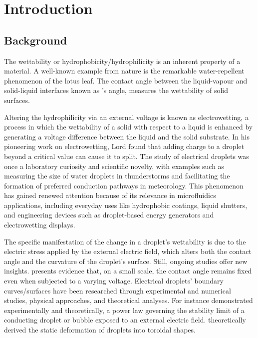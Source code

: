 \chapter{Introduction}
\setcounter{page}{1}%



\section{Background}
\hspace{0em}\indent The wettability or hydrophobicity/hydrophilicity is an inherent property of a material. A well-known example from nature is the remarkable water-repellent phenomenon of the lotus leaf. The contact angle between the liquid-vapour and solid-liquid interfaces known as \citeauthor{young_1805}’s angle, measures the wettability of solid surfaces. 

Altering the hydrophilicity via an external voltage is known as electrowetting, a process in which the wettability of a solid with respect to a liquid is enhanced by generating a voltage difference between the liquid and the solid substrate\cite{quin_05}. In his pioneering work on electrowetting, Lord \citeauthor{Rayleigh_1882} found that adding charge to a droplet beyond a critical value can cause it to split. The study of electrical droplets was once a laboratory curiosity and scientific novelty, with examples such as measuring the size of water droplets in thunderstorms and facilitating the formation of preferred conduction pathways in meteorology\cite{WSON_1921}. This phenomenon has gained renewed attention because of its relevance in microfluidics applications, including everyday uses like hydrophobic coatings\cite{Sushanta_18}, liquid shutters\cite{Lee_21}, and engineering devices such as droplet-based energy generators\cite{Wu_20} and electrowetting displays\cite{Yong_17}.

The specific manifestation of the change in a droplet's wettability is due to the electric stress applied by the external electric field, which alters both the contact angle and the curvature of the droplet's surface\cite{Taylor_64}. Still, ongoing studies offer new insights. \citeauthor{MugeleF2007} presents evidence that, on a small scale, the contact angle remains fixed even when subjected to a varying voltage. Electrical droplets' boundary curves/surfaces have been researched through experimental and numerical studies, physical approaches, and theoretical analyses. For instance \citeauthor{BerozJ_19} demonstrated experimentally and theoretically, a power law governing the stability limit of a conducting droplet or bubble exposed to an external electric field. \citeauthor{Fontelos2008_2} theoretically derived the static deformation of droplets into toroidal shapes.

